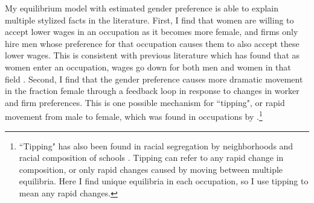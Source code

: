 \documentclass[12pt]{article}
\begin{document}








My equilibrium model with estimated gender preference is able to explain multiple stylized facts in the literature. First, I find that women are willing to accept lower wages in an occupation as it becomes more female, and firms only hire men whose preference for that occupation causes them to also accept these lower wages. This is consistent with previous literature which has found that as women enter an occupation, wages go down for both men and women in that field \cite{Levanon2009, Harris2018}. Second, I find that the gender preference causes more dramatic movement in the fraction female through a feedback loop in response to changes in worker and firm preferences. This is one possible mechanism for ``tipping", or rapid movement from male to female, which was found in occupations by .\footnote{``Tipping" has also been found in racial segregation by neighborhoods \cite{Card2008} and racial composition of schools \cite{Caetano2017}. Tipping can refer to any rapid change in composition, or only rapid changes caused by moving between multiple equilibria. Here I find unique equilibria in each occupation, so I use tipping to mean any rapid changes.} 
\end{document}
